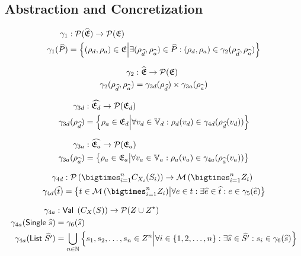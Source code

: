 \subsection{Abstraction and Concretization}\label{subsec:abstraction-and-concretization}

\begin{align}
    \gamma_1 &: \mathcal{P}(\widehat{\mathfrak{E}}) \rightarrow \mathcal{P}(\mathfrak{E}) \\
    \gamma_1(\widehat{P}) &= \left\{ (\rho_{d}, \rho_{a}) \in \mathfrak{E} \middle| \exists (\rho_{\widehat{d}}, \rho_{\widehat{a}}) \in \widehat{P} : (\rho_{d}, \rho_{a}) \in \gamma_2(\rho_{\widehat{d}}, \rho_{\widehat{a}})\right\}
\end{align}

\begin{align}
    \gamma_2 &: \widehat{\mathfrak{E}} \rightarrow \mathcal{P}(\mathfrak{E}) \\
    \gamma_2(\rho_{\widehat{d}}, \rho_{\widehat{a}}) &= \gamma_{3d}(\rho_{\widehat{d}}) \times \gamma_{3a}(\rho_{\widehat{a}})
\end{align}

\begin{align}
    \gamma_{3d} &: \widehat{\mathfrak{E}_d} \rightarrow \mathcal{P}(\mathfrak{E}_d) \\
    \gamma_{3d}(\rho_{\widehat{d}}) &= \left\{ \rho_{a} \in \mathfrak{E}_d \middle| \forall v_d \in \mathbb{V}_d : \rho_d(v_d) \in \gamma_{4d}(\rho_{\widehat{d}}(v_d)) \right\}
\end{align}

\begin{align}
    \gamma_{3a} &: \widehat{\mathfrak{E}_a} \rightarrow \mathcal{P}(\mathfrak{E}_a) \\
    \gamma_{3a}(\rho_{\widehat{a}}) &= \left\{ \rho_{a} \in \mathfrak{E}_a \middle| \forall v_a \in \mathbb{V}_a : \rho_a(v_a) \in \gamma_{4a}(\rho_{\widehat{a}}(v_a)) \right\}
\end{align}

\begin{align}
    \concrete_{4d} &: \mathcal{P}\left(\bigtimes_{i = 1}^{n}C_{X_i}(S_i)\right) \rightarrow \mathcal{M}\left(\bigtimes_{i = 1}^n Z_i\right) \\
    \concrete_{4d}(\ab{t}) &= \left\{ t \in \mathcal{M}\left(\bigtimes_{i = 1}^n Z_i\right) \middle|\forall e \in t : \exists \ab{e} \in \ab{t} : e \in \concrete_5(\ab{e}) \right\}
\end{align}

\begin{align}
    \gamma_{4a} &: \mathsf{Val} \; \left(C_{X}(S)\right) \rightarrow \mathcal{P}(Z \cup Z^\star) \\
    \gamma_{4a}(\mathsf{Single} \; \widehat{s}) &= \gamma_6(\widehat{s}) \\
    \gamma_{4a}(\mathsf{List} \; \widehat{S'}) &= \bigcup_{n \in \mathbb{N}}\left\{s_1, s_2, \dots, s_n \in Z^n \middle| \forall i \in \{1, 2, \dots, n\} : \exists \widehat{s} \in \widehat{S'} : s_i \in \gamma_6(\widehat{s}) \right\}
\end{align}

